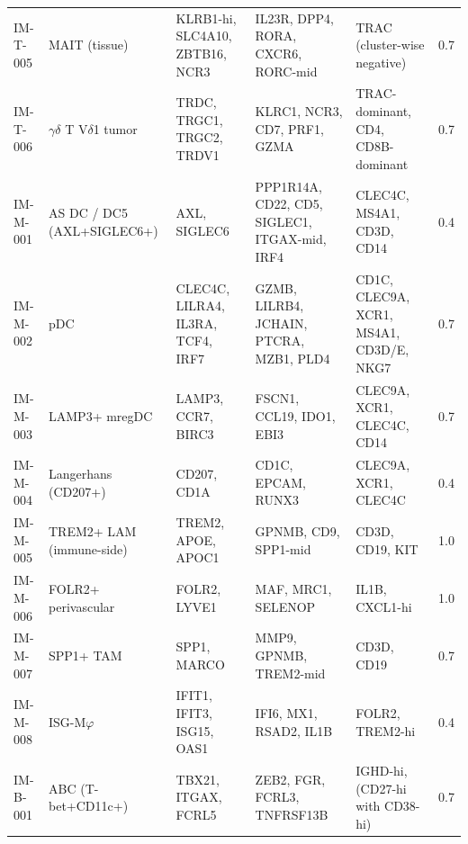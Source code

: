 \begin{longtable}{@{}l l p{42mm} p{38mm} p{34mm} l@{}}
IM-T-005 & MAIT (tissue)                       & KLRB1-hi, SLC4A10, ZBTB16, NCR3            & IL23R, DPP4, RORA, CXCR6, RORC-mid             & TRAC (cluster-wise negative)                   & 0.7 \\
IM-T-006 & $\gamma\delta$ T V$\delta$1 tumor   & TRDC, TRGC1, TRGC2, TRDV1                  & KLRC1, NCR3, CD7, PRF1, GZMA                   & TRAC-dominant, CD4, CD8B-dominant              & 0.7 \\
IM-M-001 & AS DC / DC5 (AXL+SIGLEC6+)          & AXL, SIGLEC6                               & PPP1R14A, CD22, CD5, SIGLEC1, ITGAX-mid, IRF4  & CLEC4C, MS4A1, CD3D, CD14                     & 0.4 \\
IM-M-002 & pDC                                 & CLEC4C, LILRA4, IL3RA, TCF4, IRF7          & GZMB, LILRB4, JCHAIN, PTCRA, MZB1, PLD4        & CD1C, CLEC9A, XCR1, MS4A1, CD3D/E, NKG7        & 0.7 \\
IM-M-003 & LAMP3+ mregDC                       & LAMP3, CCR7, BIRC3                         & FSCN1, CCL19, IDO1, EBI3                       & CLEC9A, XCR1, CLEC4C, CD14                    & 0.7 \\
IM-M-004 & Langerhans (CD207+)                 & CD207, CD1A                                & CD1C, EPCAM, RUNX3                             & CLEC9A, XCR1, CLEC4C                          & 0.4 \\
IM-M-005 & TREM2+ LAM (immune-side)            & TREM2, APOE, APOC1                         & GPNMB, CD9, SPP1-mid                           & CD3D, CD19, KIT                                & 1.0 \\
IM-M-006 & FOLR2+ perivascular                 & FOLR2, LYVE1                               & MAF, MRC1, SELENOP                             & IL1B, CXCL1-hi                                 & 1.0 \\
IM-M-007 & SPP1+ TAM                           & SPP1, MARCO                                & MMP9, GPNMB, TREM2-mid                         & CD3D, CD19                                     & 0.7 \\
IM-M-008 & ISG-M$\varphi$                      & IFIT1, IFIT3, ISG15, OAS1                  & IFI6, MX1, RSAD2, IL1B                         & FOLR2, TREM2-hi                                & 0.4 \\
IM-B-001 & ABC (T-bet+CD11c+)                  & TBX21, ITGAX, FCRL5                        & ZEB2, FGR, FCRL3, TNFRSF13B                    & IGHD-hi, (CD27-hi with CD38-hi)               & 0.7 \\

\end{longtable}

